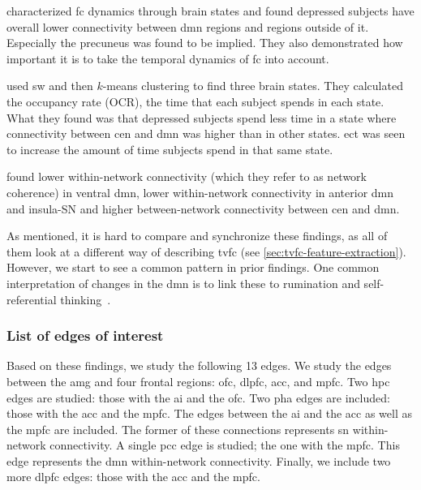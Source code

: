 \textcite{AlonsoMartinez2020} characterized \gls{fc} dynamics through brain states and found depressed subjects have overall lower connectivity between \gls{dmn} regions and regions outside of it.
Especially the precuneus was found to be implied.
They also demonstrated how important it is to take the temporal dynamics of \gls{fc} into account.

\textcite{Dini2021} used \gls{sw} and then $k$-means clustering to find three brain states.
They calculated the occupancy rate (OCR), the time that each subject spends in each state.
What they found was that depressed subjects spend less time in a state where connectivity between \gls{cen} and \gls{dmn} was higher than in other states.
\Gls{ect} was seen to increase the amount of time subjects spend in that same state.

\textcite{Ho2021} found lower within-network connectivity (which they refer to as network coherence) in ventral \gls{dmn}, lower within-network connectivity in anterior \gls{dmn} and insula-SN and higher between-network connectivity between \gls{cen} and \gls{dmn}.

As mentioned, it is hard to compare and synchronize these findings, as all of them look at a different way of describing \gls{tvfc} (see \cref{sec:tvfc-feature-extraction}).
However, we start to see a common pattern in prior findings.
One common interpretation of changes in the \gls{dmn} is to link these to rumination and self-referential thinking~\parencite{Zhou2020}.

\subsubsection{List of edges of interest}

Based on these findings, we study the following 13 edges.
We study the edges between the \gls{amg} and four frontal regions: \gls{ofc}, \gls{dlpfc}, \gls{acc}, and \gls{mpfc}.
Two \gls{hpc} edges are studied: those with the \gls{ai} and the \gls{ofc}.
Two \gls{pha} edges are included: those with the \gls{acc} and the \gls{mpfc}.
The edges between the \gls{ai} and the \gls{acc} as well as the \gls{mpfc} are included.  %
The former of these connections represents \gls{sn} within-network connectivity.
A single \gls{pcc} edge is studied; the one with the \gls{mpfc}.  %
This edge represents the \gls{dmn} within-network connectivity.
Finally, we include two more \gls{dlpfc} edges: those with the \gls{acc} and the \gls{mpfc}. %

